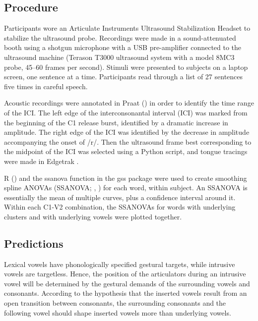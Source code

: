 \documentclass[output=paper,colorlinks,citecolor=brown]{langscibook}
\begin{document}
\subsection{Procedure}

Participants wore an Articulate Instruments Ultrasound Stabilization Headset \citep{Wrench2008} to stabilize the ultrasound probe. Recordings were made in a sound-attenuated booth using a shotgun microphone with a USB pre-amplifier connected to the ultrasound machine (Terason T3000 ultrasound system with a model 8MC3 probe, 45--60 frames per second). Stimuli were presented to subjects on a laptop screen, one sentence at a time. Participants read through a list of 27 sentences five times in careful speech.

Acoustic recordings were annotated in Praat (\citealt{BoersmaWeekink}) in order to identify the time range of the ICI. The left edge of the interconsonantal interval (ICI) was marked from the beginning of the C1 release burst, identified by a dramatic increase in amplitude. The right edge of the ICI was identified by the decrease in amplitude accompanying the onset of /r/. Then the ultrasound frame best corresponding to the midpoint of the ICI was selected using a Python script, and tongue tracings were made in Edgetrak \citep{Lietal2005}.

R (\citealt{R}) and the ssanova function in the gss package \citep{Gu2014} were used to create smoothing spline ANOVAs (SSANOVA; \citealt{Gu2002}, \citealt{Davidson2005}) for each word, within subject. An SSANOVA is essentially the mean of multiple curves, plus a confidence interval around it. Within each C1-V2 combination, the SSANOVAs for words with underlying clusters and with underlying vowels were plotted together.

\subsection{Predictions}

Lexical vowels have phonologically specified gestural targets, while intrusive vowels are targetless. Hence, the position of the articulators during an intrusive vowel will be determined by the gestural demands of the surrounding vowels and consonants. According to the hypothesis that the inserted vowels result from an open transition between consonants, the surrounding consonants and the following vowel should shape inserted vowels more than underlying vowels.
\end{document}
